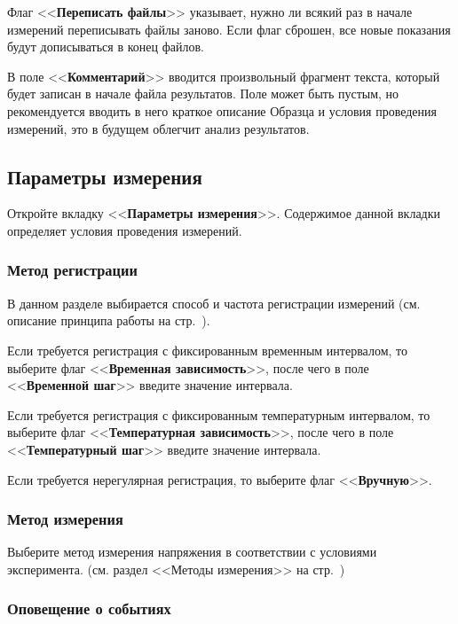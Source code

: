 \documentclass[12pt, a4paper, twocolumn]{book}
\newcommand{\CTL}[1]{<<{\bf #1}>>}
\begin{document}
Флаг \CTL{Переписать файлы} указывает, нужно ли всякий раз в начале измерений переписывать файлы заново. Если флаг сброшен, все новые показания будут дописываться в конец файлов.

В поле \CTL{Комментарий}\label{sec_dut_comment} вводится произвольный фрагмент текста, который будет записан в начале файла результатов. Поле может быть пустым, но рекомендуется вводить в него краткое описание Образца и условия проведения измерений, это в будущем облегчит анализ результатов.

\subsection{Параметры измерения}

Откройте вкладку \CTL{Параметры измерения}. Содержимое данной вкладки определяет условия проведения измерений.

\subsubsection{Метод регистрации}
\label{sec_reg_method}

В данном разделе выбирается способ и частота регистрации измерений (см. описание принципа работы на стр.~\pageref{sec_registration_types}).

Если требуется регистрация с фиксированным временным интервалом, то выберите флаг \CTL{Временная зависимость}, после чего в поле \CTL{Временной шаг} введите значение интервала.

Если требуется регистрация с фиксированным температурным интервалом, то выберите флаг \CTL{Температурная зависимость}, после чего в поле \CTL{Температурный шаг} введите значение интервала.

Если требуется нерегулярная регистрация, то выберите флаг \CTL{Вручную}.

\subsubsection{Метод измерения}

Выберите метод измерения напряжения в соответствии с условиями эксперимента. (см. раздел <<Методы измерения>> на стр.~\pageref{sec_measurement_method})

\subsubsection{Оповещение о событиях}
\end{document}
